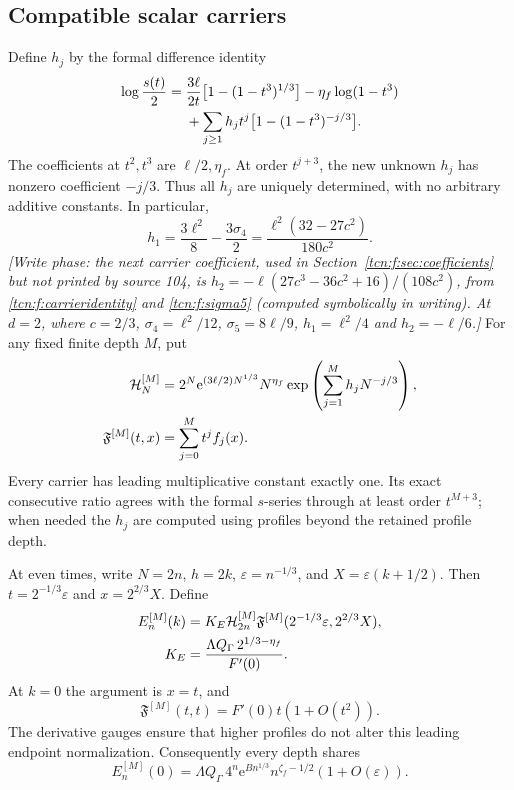 \documentclass[11pt,letterpaper]{article}
\newcommand{\eps}{\varepsilon}
\newcommand{\ee}{\mathrm e}
\theoremstyle{remark}
\begin{document}
\subsection{Compatible scalar carriers}
Define $h_j$ by the formal difference identity
\begin{align}
 \log\frac{s(t)}2={}&\frac{3\ell}{2t}\bigl[1-(1-t^3)^{1/3}\bigr]
                    -\eta_f\log(1-t^3)\notag\\
 &+\sum_{j\ge1}h_jt^j\bigl[1-(1-t^3)^{-j/3}\bigr].\label{tcn:f:carrieridentity}
\end{align}
The coefficients at $t^2,t^3$ are $\ell/2,\eta_f$. At order $t^{j+3}$, the new unknown $h_j$ has nonzero coefficient $-j/3$. Thus all $h_j$ are uniquely determined, with no arbitrary additive constants. In particular,
\begin{equation}\label{tcn:f:h1}
 h_1=\frac{3\ell^2}{8}-\frac{3\sigma_4}{2}
     =\frac{\ell^2(32-27c^2)}{180c^2}.
\end{equation}
\emph{[Write phase: the next carrier coefficient, used in Section~\ref{tcn:f:sec:coefficients} but not printed by source 104, is $h_2=-\ell(27c^3-36c^2+16)/(108c^2)$, from \eqref{tcn:f:carrieridentity} and \eqref{tcn:f:sigma5} (computed symbolically in writing). At $d=2$, where $c=2/3$, $\sigma_4=\ell^2/12$, $\sigma_5=8\ell/9$, $h_1=\ell^2/4$ and $h_2=-\ell/6$.]}
For any fixed finite depth $M$, put
\begin{align}
 \mathcal H_N^{[M]}&=2^N
 \ee^{(3\ell/2)N^{1/3}}N^{\eta_f}
 \exp\left(\sum_{j=1}^Mh_jN^{-j/3}\right),\notag\\
 \mathfrak F^{[M]}(t,x)&=\sum_{j=0}^Mt^jf_j(x).\label{tcn:f:carrier}
\end{align}
Every carrier has leading multiplicative constant exactly one. Its exact consecutive ratio agrees with the formal $s$-series through at least order $t^{M+3}$; when needed the $h_j$ are computed using profiles beyond the retained profile depth.

At even times, write $N=2n$, $h=2k$, $\eps=n^{-1/3}$, and $X=\eps(k+1/2)$. Then $t=2^{-1/3}\eps$ and $x=2^{2/3}X$. Define
\begin{align}
 E_n^{[M]}(k)&=K_E\mathcal H_{2n}^{[M]}
 \mathfrak F^{[M]}(2^{-1/3}\eps,2^{2/3}X),\notag\\
 K_E&=\frac{\Lambda Q_\Gamma\,2^{1/3-\eta_f}}{F'(0)}.\label{tcn:f:Eprofile}
\end{align}
At $k=0$ the argument is $x=t$, and
\[
 \mathfrak F^{[M]}(t,t)=F'(0)t(1+O(t^2)).
\]
The derivative gauges ensure that higher profiles do not alter this leading endpoint normalization. Consequently every depth shares
\begin{equation}\label{tcn:f:Eleading}
 E_n^{[M]}(0)=\Lambda Q_\Gamma\,4^n\ee^{Bn^{1/3}}n^{\zeta_f-1/2}(1+O(\eps)).
\end{equation}
\end{document}

